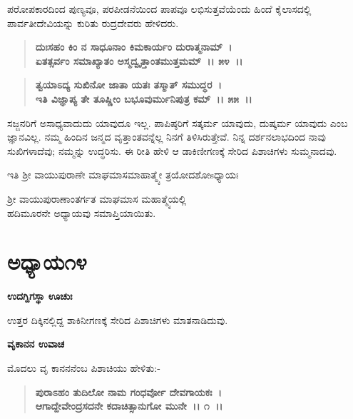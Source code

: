 ಪರೋಪಕಾರದಿಂದ ಪುಣ್ಯವೂ, ಪರಪೀಡನೆಯಿಂದ ಪಾಪವೂ ಲಭಿಸುತ್ತವೆಯೆಂದು ಹಿಂದೆ ಕೈಲಾಸದಲ್ಲಿ ಪಾರ್ವತೀದೇವಿಯನ್ನು ಕುರಿತು ರುದ್ರದೇವರು ಹೇಳಿದರು.

\begin{verse}
\textbf{ದುಃಸಹಂ ಕಿಂ ನ ಸಾಧೂನಾಂ ಕಿಮಕಾರ್ಯಂ ದುರಾತ್ಮನಾಮ್~।}\\\textbf{ಏತತ್ಸರ್ವಂ ಸಮಾಖ್ಯಾತಂ ಅಸ್ಮದ್ವೃತ್ತಾಂತಮುತ್ತಮಮ್~।। ೫೪~।। }
\end{verse}

\begin{verse}
\textbf{ತ್ವಯಾಽದ್ಯ ಸುಖಿನೋ ಜಾತಾ ಯತಃ ತಸ್ಮಾತ್ ಸಮುದ್ಧರ~।}\\\textbf{ಇತಿ ವಿಜ್ಞಾಪ್ಯ ತೇ ತೂಷ್ಣೀಂ ಬಭೂವುರ್ಮುನಿಪುತ್ರ ಕಮ್~।। ೫೫~।।}
\end{verse}

ಸಜ್ಜನರಿಗೆ ಅಸಾಧ್ಯವಾದುದು ಯಾವುದೂ ಇಲ್ಲ. ಪಾಪಿಷ್ಠರಿಗೆ ಸತ್ಕರ್ಮ ಯಾವುದು, ದುಷ್ಕರ್ಮ ಯಾವುದು ಎಂಬ ಜ್ಞಾನವಿಲ್ಲ. ನಮ್ಮ ಹಿಂದಿನ ಜನ್ಮದ ವೃತ್ತಾಂತವನ್ನೆಲ್ಲ ನಿನಗೆ ತಿಳಿಸಿರುತ್ತೇವೆ. ನಿನ್ನ ದರ್ಶನಲಾಭದಿಂದ ನಾವು ಸುಖಿಗಳಾದೆವು; ನಮ್ಮನ್ನು ಉದ್ಧರಿಸು. ಈ ರೀತಿ ಹೇಳಿ ಆ ಡಾಕಿಣೀಗಣಕ್ಕೆ ಸೇರಿದ ಪಿಶಾಚಿಗಳು ಸುಮ್ಮನಾದವು.

\begin{center}
ಇತಿ ಶ‍್ರೀ ವಾಯುಪುರಾಣೇ ಮಾಘಮಾಸಮಾಹಾತ್ಮ್ಯೇ ತ್ರಯೋದಶೋsಧ್ಯಾಯಃ 
\end{center}

\begin{center}
ಶ‍್ರೀ ವಾಯುಪುರಾಣಾಂತರ್ಗತ ಮಾಘಮಾಸ ಮಹಾತ್ಮ್ಯೆಯಲ್ಲಿ\\ ಹದಿಮೂರನೇ ಅಧ್ಯಾಯವು ಸಮಾಪ್ತಿಯಾಯಿತು.
\end{center}

\newpage

\section*{ಅಧ್ಯಾಯ\enginline{-}೧೪}

\emptypage

\begin{flushleft}
\textbf{ಉದಗ್ದಿಗಸ್ಥಾ ಊಚುಃ\enginline{-}}
\end{flushleft}

ಉತ್ತರ ದಿಕ್ಕಿನಲ್ಲಿದ್ದ ಶಾಕಿನೀಗಣಕ್ಕೆ ಸೇರಿದ ಪಿಶಾಚಿಗಳು ಮಾತನಾಡಿದುವು.

\begin{flushleft}
\textbf{ವೃಕಾನನ ಉವಾಚ\enginline{-}}
\end{flushleft}

ಮೊದಲು ವೃ ಕಾನನನೆಂಬ ಪಿಶಾಚಿಯು ಹೇಳಿತು:-

\begin{verse}
\textbf{ಪುರಾಽಹಂ ತುದಿಲೋ ನಾಮ ಗಂಧರ್ವೋ ದೇವಗಾಯಕಃ~।}\\\textbf{ಆಗಾದ್ದೇವೇಂದ್ರಸದನೇ ಕದಾಚಿತ್ಸಾನುಗೋ ಮುನೇ~।। ೧~।। }
\end{verse}

